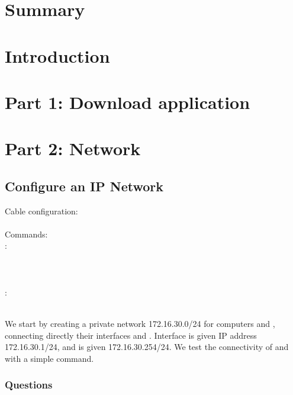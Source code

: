\documentclass[compilation.tex]{subfiles}
\begin{document}
\section{Summary}
\label{sec:summary}

\section{Introduction}
\label{sec:introduction}

\section{Part 1: Download application}
\label{sec:downloadapp}

\section{Part 2: Network}
\label{sec:network}

\clearpage
\subsection{Configure an IP Network}
\label{subsec:exp1}

\begin{cables}{7}{0.45}
	Cable configuration:\\
	\\
	
	Commands:\\
	:\\
	\\
	\\
	\\
	:\\
	\\
\end{cables}

We start by creating a private network 172.16.30.0/24 for computers  and , connecting directly their interfaces  and . Interface  is given IP address 172.16.30.1/24, and  is given 172.16.30.254/24.
We test the connectivity of  and  with a simple  command.

\subsubsection{Questions}
\label{subsubsec:exp1questions}
\end{document}
